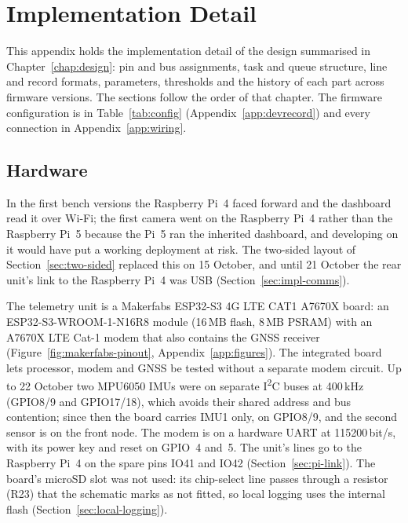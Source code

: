 \chapter{Implementation Detail}
\label{app:impl}

This appendix holds the implementation detail of the design summarised in Chapter~\ref{chap:design}: pin and bus assignments, task and queue structure, line and record formats, parameters, thresholds and the history of each part across firmware versions. The sections follow the order of that chapter. The firmware configuration is in Table~\ref{tab:config} (Appendix~\ref{app:devrecord}) and every connection in Appendix~\ref{app:wiring}.

\section{Hardware}
\label{sec:impl-hardware}

In the first bench versions the Raspberry Pi~4 faced forward and the dashboard read it over Wi-Fi; the first camera went on the Raspberry Pi~4 rather than the Raspberry Pi~5 because the Pi~5 ran the inherited dashboard, and developing on it would have put a working deployment at risk. The two-sided layout of Section~\ref{sec:two-sided} replaced this on 15 October, and until 21 October the rear unit's link to the Raspberry Pi~4 was USB (Section~\ref{sec:impl-comms}).

The telemetry unit is a Makerfabs ESP32-S3 4G LTE CAT1 A7670X board: an ESP32-S3-WROOM-1-N16R8 module (16\,MB flash, 8\,MB PSRAM) with an A7670X LTE Cat-1 modem that also contains the GNSS receiver \cite{makerfabsa7670x} (Figure~\ref{fig:makerfabs-pinout}, Appendix~\ref{app:figures}). The integrated board lets processor, modem and GNSS be tested without a separate modem circuit. Up to 22 October two MPU6050 IMUs were on separate I\textsuperscript{2}C buses at 400\,kHz (GPIO8/9 and GPIO17/18), which avoids their shared address and bus contention; since then the board carries IMU1 only, on GPIO8/9, and the second sensor is on the front node. The modem is on a hardware UART at 115200\,bit/s, with its power key and reset on GPIO~4 and~5. The unit's lines go to the Raspberry Pi~4 on the spare pins IO41 and IO42 (Section~\ref{sec:pi-link}). The board's microSD slot was not used: its chip-select line passes through a resistor (R23) that the schematic marks as not fitted, so local logging uses the internal flash (Section~\ref{sec:local-logging}).

